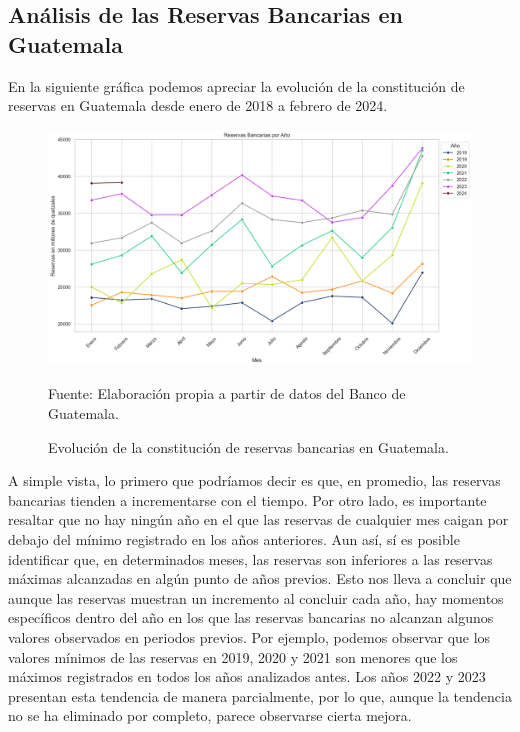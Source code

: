 \subsection{Análisis de las Reservas Bancarias en Guatemala }
En la siguiente gráfica podemos apreciar la evolución de la constitución de reservas en Guatemala desde enero de 2018 a febrero de 2024. 
\begin{figure}[h]
    \centering
    \includegraphics[scale=0.5]{imagenes/reservas_en_guatemala.png}
    \caption{Evolución de la constitución de reservas bancarias en Guatemala.}
    \small{Fuente: Elaboración propia a partir de  datos del Banco de Guatemala.}
    \label{evolucion de reservas}
\end{figure}



A simple vista, lo primero que podríamos decir es que, en promedio, las reservas bancarias tienden a incrementarse con el tiempo. Por otro lado, es importante resaltar que no hay ningún año en el que las reservas de cualquier mes caigan por debajo del mínimo registrado en los años anteriores. Aun así, sí es posible identificar que, en determinados meses, las reservas son inferiores a las reservas máximas alcanzadas en algún punto de años previos. Esto nos lleva a concluir que aunque las reservas muestran un incremento al concluir cada año, hay momentos específicos dentro del año en los que las reservas bancarias no alcanzan algunos valores observados en periodos previos. Por ejemplo, podemos observar que los valores mínimos de las reservas en 2019, 2020 y 2021 son menores que los máximos registrados en todos los años analizados antes. Los años 2022 y 2023 presentan esta tendencia de manera parcialmente, por lo que, aunque la tendencia no se ha eliminado por completo, parece observarse cierta mejora. \\



